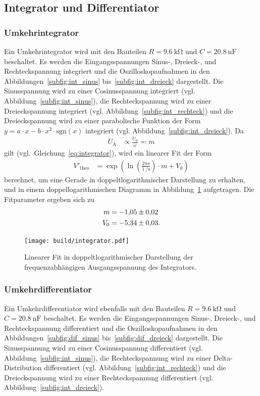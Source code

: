 \FloatBarrier

\subsection{Integrator und Differentiator}
\subsubsection{Umkehrintegrator}
Ein Umkehrintegrator wird mit den Bauteilen $R = \SI{9.6}{\kilo\ohm}$ und $C = \SI{20.8}{\nano\farad}$ beschaltet.
Es werden die Eingangsspannungen Sinus-, Dreieck-, und Rechteckspannung integriert und die Oszilloskopaufnahmen in den Abbildungen~\ref{subfig:int_sinus} bis~\ref{subfig:int_dreieck} dargestellt.
Die Sinusspannung wird zu einer Cosinusspannung integriert (vgl. Abbildung~\ref{subfig:int_sinus}),
die Rechteckspannung wird zu einer Dreieckspannung integriert (vgl. Abbildung~\ref{subfig:int_rechteck})
und die Dreieckspannung wird zu einer parabolische Funktion der Form $y = a \cdot x - b \cdot x^2 \cdot \text{sgn}(x)$ integriert (vgl. Abbildung~\ref{subfig:int_dreieck}).
Da
\begin{align*}
  U_\text{A} &\propto \frac{U_0}{\omega} \eqqcolon m
\end{align*}
gilt (vgl.\ Gleichung~\eqref{eq:integrator}),
wird ein linearer Fit der Form
\begin{align*}
  V'_\text{theo} &=
    \exp\!{\left(
      \ln\!{\left(
        \frac{2 \pi \nu}{\SI{1}{\per\second}}
      \right)}
      \cdot
      m
      + V_0
    \right)}
\end{align*}
berechnet, um eine Gerade in doppeltlogarithmischer Darstellung zu erhalten,
und in einem doppellogarithmischen Diagramm in Abbildung~\ref{fig:int} aufgetragen.
Die Fitparameter ergeben sich zu
\begin{align*}
  m &= \num{-1.05 \pm 0.02} \\
  V_0 &= \num{-5.34 \pm 0.03}.
\end{align*}

\begin{figure}[ht]
  \centering
  \texttt{[image: build/integrator.pdf]}
  \caption{Linearer Fit in doppeltlogarithmischer Darstellung der frequenzabhängigen Ausgangsspannung des Integrators.}
  \label{fig:int}
\end{figure}

\subsubsection{Umkehrdifferentiator}
Ein Umkehrdifferentiator wird ebenfalls mit den Bauteilen $R = \SI{9.6}{\kilo\ohm}$ und $C = \SI{20.8}{\nano\farad}$ beschaltet.
Es werden die Eingangsspannungen Sinus-, Dreieck-, und Rechteckspannung differentiert und die Oszilloskopaufnahmen in den Abbildungen~\ref{subfig:dif_sinus} bis~\ref{subfig:dif_dreieck} dargestellt.
Die Sinusspannung wird zu einer Cosinusspannung differentiert (vgl. Abbildung~\ref{subfig:int_sinus}),
die Rechteckspannung wird zu einer Delta-Distribution differentiert (vgl. Abbildung~\ref{subfig:int_rechteck})
und die Dreieckspannung wird zu einer Rechteckspannung  differentiert (vgl. Abbildung~\ref{subfig:int_dreieck}).

